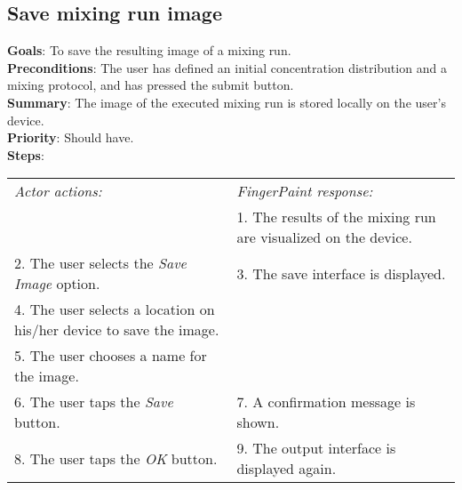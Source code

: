 \begin{appendices}
\section{Save mixing run image}
  \textbf{Goals}: To save the resulting image of a mixing run.\\
  \textbf{Preconditions}: The user has defined an initial concentration distribution and a mixing protocol, and has pressed the submit button.\\
  \textbf{Summary}: The image of the executed mixing run is stored locally on the user's device.\\
  \textbf{Priority}: Should have.\\
  \textbf{Steps}: \\
  \begin{tabular}{ p{} p{} }
  	\emph{Actor actions:} & \emph{FingerPaint response:} \\
	   & 1. The results of the mixing run are visualized on the device. \\
	 2. The user selects the \emph{Save Image} option. & 3. The save interface is displayed.\\
	 4. The user selects a location on his/her device to save the image. & \\
	 5. The user chooses a name for the image. & \\
	 6. The user taps the \emph{Save} button. & 7. A confirmation message is shown. \\
	 8. The user taps the \emph{OK} button. & 9. The output interface is displayed again. \\
  \end{tabular}


\end{appendices}
